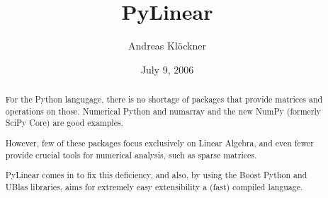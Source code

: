 \documentclass[hyperref]{manual}
\title{PyLinear}
\author{Andreas Kl\"ockner}
\date{July 9, 2006}
\begin{document}
\maketitle

\begin{abstract}
  \noindent
  For the Python langugage, there is no shortage of packages that
  provide matrices and operations on those. Numerical Python and
  numarray and the new NumPy (formerly SciPy Core) are good examples.

  However, few of these packages focus exclusively on Linear Algebra,
  and even fewer provide crucial tools for numerical analysis, such as
  sparse matrices.

  PyLinear comes in to fix this deficiency, and also, by using the 
  Boost Python and UBlas libraries, aims for extremely easy extensibility
  a (fast) compiled language.
\end{abstract}

\tableofcontents









\appendix




\end{document}

